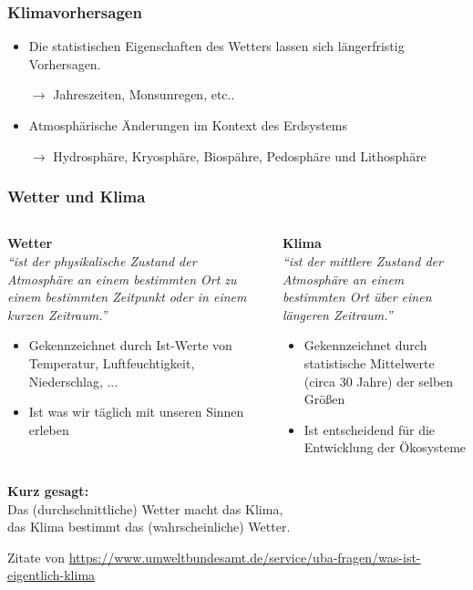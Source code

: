 \begin{frame}
	\frametitle{Klimavorhersagen}
	\begin{itemize}
		\item Die statistischen Eigenschaften des Wetters lassen sich längerfristig Vorhersagen.
		\item[$\rightarrow$] Jahreszeiten, Monsunregen, etc.. %
		\item Atmosphärische Änderungen im Kontext des Erdsystems
		\item [$\rightarrow$] Hydrosphäre, Kryosphäre, Biospähre, Pedosphäre und Lithosphäre %
	\end{itemize}
\end{frame}

\begin{frame}
	\frametitle{Wetter und Klima}
  \begin{columns}[onlytextwidth]
    \begin{column}[t]{0.49\linewidth}
    \textbf{Wetter}\\
      \textit{\enquote{ist der physikalische Zustand der Atmosphäre an einem bestimmten Ort zu einem \alert{bestimmten Zeitpunkt} oder in einem kurzen Zeitraum.}}
      \begin{itemize}
        \item Gekennzeichnet durch Ist-Werte von Temperatur, Luftfeuchtigkeit, Niederschlag, ...
        \item Ist was wir täglich mit unseren Sinnen erleben
      \end{itemize}
    \end{column}%
    \begin{column}[t]{0.49\linewidth}
      \textbf{Klima}\\
      \textit{\enquote{ist der mittlere Zustand der Atmosphäre an einem bestimmten Ort über einen \alert{längeren Zeitraum.}}}
      \begin{itemize}
        \item Gekennzeichnet durch statistische Mittelwerte (circa 30 Jahre) der selben Größen
        \item Ist entscheidend für die Entwicklung der Ökosysteme
      \end{itemize}
    \end{column}%
  \end{columns}

  \bigskip
  \begin{center}
    \textbf{Kurz gesagt:}\\
    Das (durchschnittliche) Wetter macht das Klima, \\
    das Klima bestimmt das (wahrscheinliche) Wetter.
  \end{center}


  \vfill
	\tiny{Zitate von \url{https://www.umweltbundesamt.de/service/uba-fragen/was-ist-eigentlich-klima}}

\end{frame}
